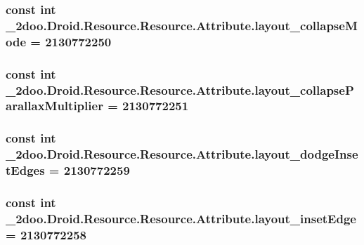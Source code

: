 \hypertarget{class__2doo_1_1_droid_1_1_resource_1_1_attribute_3e59c92adc387cae2b59d86a1d90965d}{
\subsubsection[{layout\_\-collapseMode}]{\setlength{\rightskip}{0pt plus 5cm}const int \_\-2doo.Droid.Resource.Resource.Attribute.layout\_\-collapseMode = 2130772250}}
\label{class__2doo_1_1_droid_1_1_resource_1_1_attribute_3e59c92adc387cae2b59d86a1d90965d}


\hypertarget{class__2doo_1_1_droid_1_1_resource_1_1_attribute_a19f27fa70319d08646c16eb9de84095}{
\subsubsection[{layout\_\-collapseParallaxMultiplier}]{\setlength{\rightskip}{0pt plus 5cm}const int \_\-2doo.Droid.Resource.Resource.Attribute.layout\_\-collapseParallaxMultiplier = 2130772251}}
\label{class__2doo_1_1_droid_1_1_resource_1_1_attribute_a19f27fa70319d08646c16eb9de84095}


\hypertarget{class__2doo_1_1_droid_1_1_resource_1_1_attribute_4226d6f6173bc6e2415dfffa44ab8d14}{
\subsubsection[{layout\_\-dodgeInsetEdges}]{\setlength{\rightskip}{0pt plus 5cm}const int \_\-2doo.Droid.Resource.Resource.Attribute.layout\_\-dodgeInsetEdges = 2130772259}}
\label{class__2doo_1_1_droid_1_1_resource_1_1_attribute_4226d6f6173bc6e2415dfffa44ab8d14}


\hypertarget{class__2doo_1_1_droid_1_1_resource_1_1_attribute_751183f26a94dd1aba6f32674b700e7c}{
\subsubsection[{layout\_\-insetEdge}]{\setlength{\rightskip}{0pt plus 5cm}const int \_\-2doo.Droid.Resource.Resource.Attribute.layout\_\-insetEdge = 2130772258}}
\label{class__2doo_1_1_droid_1_1_resource_1_1_attribute_751183f26a94dd1aba6f32674b700e7c}


